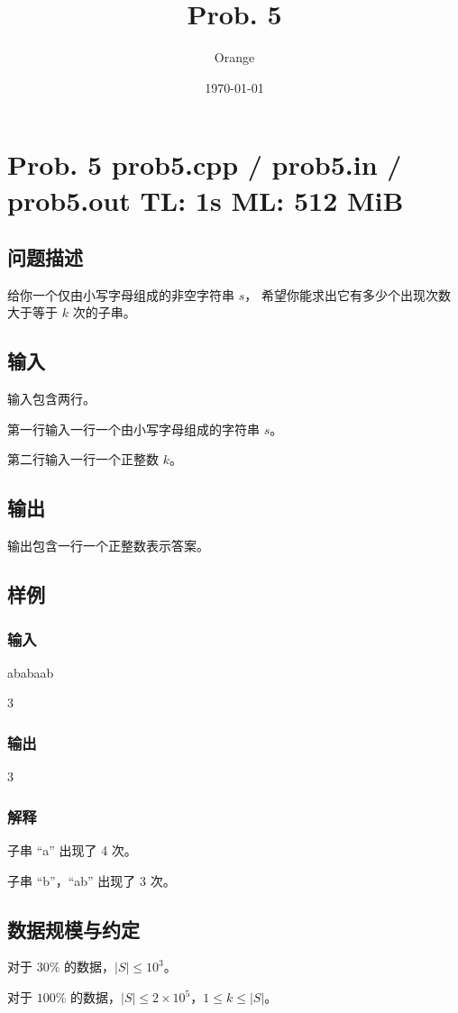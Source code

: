 \documentclass[UTF8]{article}
\title{Prob. 5}
\author{Orange}
\date{\today}
\begin{document}
	\heiti

	\section{Prob. 5 \small {prob5.cpp / prob5.in / prob5.out} TL: 1s ML: 512 MiB}

	\subsection{问题描述}

	给你一个仅由小写字母组成的非空字符串 $s$，
	希望你能求出它有多少个出现次数大于等于 $k$ 次的子串。

	\subsection{输入}

	输入包含两行。

	第一行输入一行一个由小写字母组成的字符串 $s$。

	第二行输入一行一个正整数 $k$。

	\subsection{输出}

	输出包含一行一个正整数表示答案。

	\subsection{样例}

	\subsubsection{输入}

	ababaab

	3

	\subsubsection{输出}

	3

	\subsubsection{解释}

	子串 ``a'' 出现了 4 次。

	子串 ``b''，``ab'' 出现了 3 次。

	\subsection{数据规模与约定}

	对于 $30\%$ 的数据，$|S| \le 10^3$。

	对于 $100\%$ 的数据，$|S| \le 2 \times 10^5$，$1 \le k \le |S|$。
\end{document}

